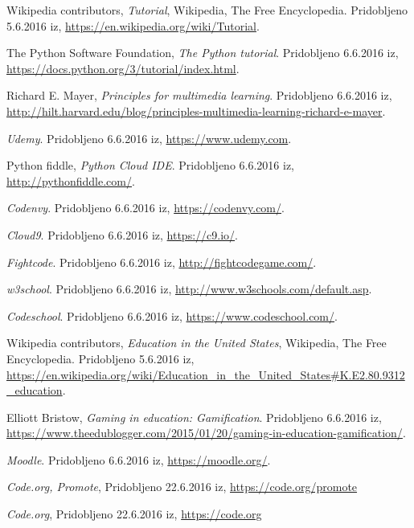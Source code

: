 \begin{thebibliography}{100}
 Wikipedia contributors, \emph{Tutorial},
  Wikipedia, The Free Encyclopedia. Pridobljeno 5.6.2016 iz,
  \url{https://en.wikipedia.org/wiki/Tutorial}.

 The Python Software Foundation, \emph{The
    Python tutorial}. Pridobljeno 6.6.2016 iz,
  \url{https://docs.python.org/3/tutorial/index.html}.

 Richard E. Mayer, \emph{Principles for multimedia learning}. Pridobljeno 6.6.2016 iz,
  \url{http://hilt.harvard.edu/blog/principles-multimedia-learning-richard-e-mayer}.

 \emph{Udemy}. Pridobljeno 6.6.2016 iz,
  \url{https://www.udemy.com}.

 Python fiddle, \emph{Python Cloud
    IDE}. Pridobljeno 6.6.2016 iz,
  \url{http://pythonfiddle.com/}.

 \emph{Codenvy}. Pridobljeno 6.6.2016 iz,
  \url{https://codenvy.com/}.

 \emph{Cloud9}. Pridobljeno 6.6.2016 iz,
  \url{https://c9.io/}.

 \emph{Fightcode}. Pridobljeno 6.6.2016 iz,
  \url{http://fightcodegame.com/}.

 \emph{w3school}. Pridobljeno 6.6.2016 iz,
  \url{http://www.w3schools.com/default.asp}.

 \emph{Codeschool}. Pridobljeno 6.6.2016 iz,
  \url{https://www.codeschool.com/}.

 Wikipedia contributors, \emph{Education in the
    United States}, Wikipedia, The Free Encyclopedia. Pridobljeno
  5.6.2016 iz,
  \url{https://en.wikipedia.org/wiki/Education_in_the_United_States#K.E2.80.9312_education}.

 Elliott Bristow, \emph{Gaming in education: Gamification}. Pridobljeno 6.6.2016 iz,
  \url{https://www.theedublogger.com/2015/01/20/gaming-in-education-gamification/}.

 \emph{Moodle}. Pridobljeno 6.6.2016 iz,
  \url{https://moodle.org/}.

 \emph{Code.org, Promote}, Pridobljeno
  22.6.2016 iz, \url{https://code.org/promote}

 \emph{Code.org}, Pridobljeno
  22.6.2016 iz, \url{https://code.org}


\end{thebibliography}
